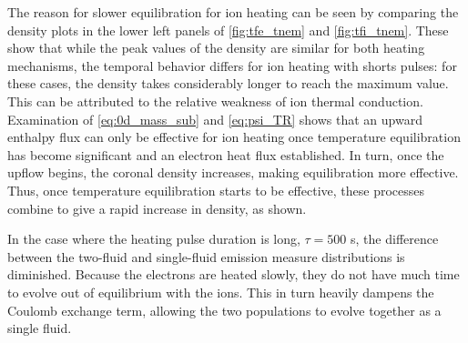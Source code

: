 \documentclass[]{aastex}
\begin{document}
	\par The reason for slower equilibration for ion heating can be seen by comparing the density plots in the lower left panels of \autoref{fig:tfe_tnem} and \autoref{fig:tfi_tnem}. These show that while the peak values of the density are similar for both heating mechanisms, the temporal behavior differs for ion heating with shorts pulses: for these cases, the density takes considerably longer to reach the maximum value. This can be attributed to the relative weakness of ion thermal conduction. Examination of \autoref{eq:0d_mass_sub} and \autoref{eq:psi_TR} shows that an upward enthalpy flux can only be effective for ion heating once temperature equilibration has become significant and an electron heat flux established. In turn, once the upflow begins, the coronal density increases, making equilibration more effective. Thus, once temperature equilibration starts to be effective, these processes combine to give a rapid increase in density, as shown.
	\par In the case where the heating pulse duration is long, $\tau=500$ s, the difference between the two-fluid and single-fluid emission measure distributions is diminished. Because the electrons are heated slowly, they do not have much time to evolve out of equilibrium with the ions. This in turn heavily dampens the Coulomb exchange term, allowing the two populations to evolve together as a single fluid.
\end{document}

